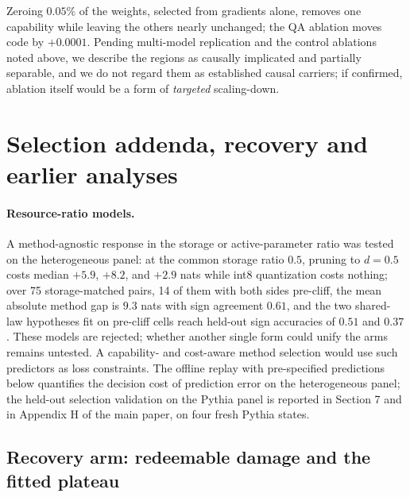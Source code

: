 Zeroing $0.05\%$ of the weights, selected from gradients alone,
removes one capability while leaving the others nearly unchanged; the QA ablation moves code by $+0.0001$. Pending multi-model
replication and the control ablations noted above, we describe the regions as
causally implicated and partially separable, and we do not regard them as
established causal carriers; if confirmed, ablation itself would be a form of
\emph{targeted} scaling-down.





\section{Selection addenda, recovery and earlier analyses}
\label{sec:supp_selection}




\paragraph{Resource-ratio models.} A method-agnostic response in the
storage or active-parameter ratio was tested on the heterogeneous
panel: at the common storage ratio $0.5$, pruning to $d=0.5$ costs
median $+5.9$, $+8.2$, and $+2.9$ nats while int8 quantization costs
nothing; over 75 storage-matched pairs, 14 of them with both sides pre-cliff, the
mean absolute method gap is $9.3$ nats with sign agreement $0.61$, and
the two shared-law hypotheses fit on pre-cliff cells reach held-out
sign accuracies of $0.51$ and $0.37$. These models are rejected;
whether another single form could unify the arms remains untested. A
capability- and cost-aware method selection would use such predictors
as loss constraints. The offline replay with pre-specified predictions
below quantifies the decision cost of prediction error on the
heterogeneous panel; the held-out selection validation on the
Pythia panel is reported in Section 7 and in Appendix H of the main paper, on four fresh Pythia
states.



\subsection{Recovery arm: redeemable damage and the fitted plateau}
\label{sec:recovery}
\label{sec:app_recovery}

